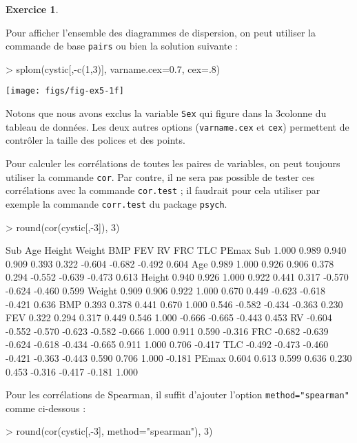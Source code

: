 \documentclass[11pt]{report}
\makeatletter
\theoremstyle{definition}
\newtheorem{exo}{Exercice}[chapter]
\newcommand{\foo}[1]{\texttt{#1}}
\newcommand{\cmd}[1]{\index{#1@\foo{#1}}}
\makeatother
\begin{document}
\begin{exo}
\begin{sol}
Pour afficher l'ensemble des diagrammes de dispersion, on peut utiliser la
commande de base \texttt{pairs} ou bien la solution suivante :
\begin{Schunk}
\begin{Sinput}
> splom(cystic[,-c(1,3)], varname.cex=0.7, cex=.8)
\end{Sinput}
\end{Schunk}
\texttt{[image: figs/fig-ex5-1f]}
\cmd{splom}

Notons que nous avons exclus la variable \texttt{Sex} qui figure dans la
3\ieme colonne du tableau de données. Les deux autres options
(\texttt{varname.cex} et \texttt{cex}) permettent de contrôler la taille des
polices et des points.

Pour calculer les corrélations de toutes les paires de variables, on peut
toujours utiliser la commande \texttt{cor}. Par contre, il ne sera pas
possible de tester ces corrélations avec la commande \texttt{cor.test} ; il
faudrait pour cela utiliser par exemple la commande \texttt{corr.test} du
package \texttt{psych}.
\begin{Schunk}
\begin{Sinput}
> round(cor(cystic[,-3]), 3)
\end{Sinput}
\begin{Soutput}
          Sub    Age Height Weight    BMP    FEV     RV    FRC    TLC  PEmax
Sub     1.000  0.989  0.940  0.909  0.393  0.322 -0.604 -0.682 -0.492  0.604
Age     0.989  1.000  0.926  0.906  0.378  0.294 -0.552 -0.639 -0.473  0.613
Height  0.940  0.926  1.000  0.922  0.441  0.317 -0.570 -0.624 -0.460  0.599
Weight  0.909  0.906  0.922  1.000  0.670  0.449 -0.623 -0.618 -0.421  0.636
BMP     0.393  0.378  0.441  0.670  1.000  0.546 -0.582 -0.434 -0.363  0.230
FEV     0.322  0.294  0.317  0.449  0.546  1.000 -0.666 -0.665 -0.443  0.453
RV     -0.604 -0.552 -0.570 -0.623 -0.582 -0.666  1.000  0.911  0.590 -0.316
FRC    -0.682 -0.639 -0.624 -0.618 -0.434 -0.665  0.911  1.000  0.706 -0.417
TLC    -0.492 -0.473 -0.460 -0.421 -0.363 -0.443  0.590  0.706  1.000 -0.181
PEmax   0.604  0.613  0.599  0.636  0.230  0.453 -0.316 -0.417 -0.181  1.000
\end{Soutput}
\end{Schunk}
\cmd{round}\cmd{cor}
Pour les corrélations de Spearman, il suffit d'ajouter l'option
\verb|method="spearman"| comme ci-dessous :
\begin{Schunk}
\begin{Sinput}
> round(cor(cystic[,-3], method="spearman"), 3)
\end{Sinput}

\end{Schunk}
\end{sol}
\end{exo}
\end{document}

